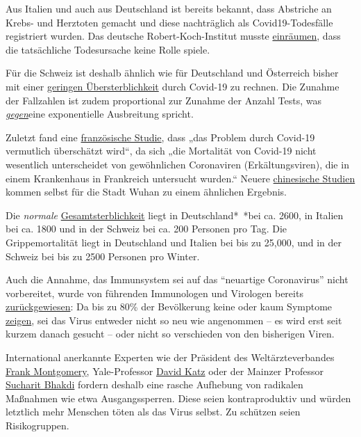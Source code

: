 Aus Italien und auch aus Deutschland ist bereits bekannt, dass Abstriche
an Krebs- und Herztoten gemacht und diese nachträglich als
Covid19-Todesfälle registriert wurden. Das deutsche Robert-Koch-Institut
musste
\href{https://swprs.org/rki-relativiert-corona-todesfaelle/}{einräumen},
dass die tatsächliche Todesursache keine Rolle spiele.

Für die Schweiz ist deshalb ähnlich wie für Deutschland und Österreich
bisher mit einer \href{https://www.euromomo.eu/index.html}{geringen
Übersterblichkeit} durch Covid-19 zu rechnen. Die Zunahme der Fallzahlen
ist zudem proportional zur Zunahme der Anzahl Tests, was
\href{https://multipolar-magazin.de/artikel/coronavirus-irrefuhrung-fallzahlen}{\emph{gegen}}eine
exponentielle Ausbreitung spricht.

Zuletzt fand eine
\href{https://www.sciencedirect.com/science/article/abs/pii/S0924857920300972}{französische
Studie}, dass „das Problem durch Covid-19 vermutlich überschätzt wird``,
da sich „die Mortalität von Covid-19 nicht wesentlich unterscheidet von
gewöhnlichen Coronaviren (Erkältungsviren), die in einem Krankenhaus in
Frankreich untersucht wurden.`` Neuere
\href{https://www.medrxiv.org/content/10.1101/2020.02.12.20022434v2}{chinesische
Studien} kommen selbst für die Stadt Wuhan zu einem ähnlichen Ergebnis.

Die \emph{normale}
\href{https://www.euromomo.eu/index.html}{Gesamtsterblichkeit} liegt in
Deutschland*~*bei ca. 2600, in Italien bei ca. 1800 und in der Schweiz
bei ca. 200 Personen pro Tag. Die Grippemortalität liegt in Deutschland
und Italien bei bis zu 25,000, und in der Schweiz bei bis zu 2500
Personen pro Winter.

Auch die Annahme, das Immunsystem sei auf das ``neuartige Coronavirus''
nicht vorbereitet, wurde von führenden Immunologen und Virologen bereits
\href{https://soundcloud.com/radiomuenchen/wir-kultivieren-mit-dieser-masnahme-den-corona-erreger}{zurückgewiesen}:
Da bis zu 80\% der Bevölkerung keine oder kaum Symptome
\href{https://www.repubblica.it/salute/medicina-e-ricerca/2020/03/16/news/coronavirus_studio_il_50-75_dei_casi_a_vo_sono_asintomatici_e_molto_contagiosi-251474302/}{zeigen},
sei das Virus entweder nicht so neu wie angenommen -- es wird erst seit
kurzem danach gesucht -- oder nicht so verschieden von den bisherigen
Viren.

International anerkannte Experten wie der Präsident des
Weltärzteverbandes
\href{https://www.general-anzeiger-bonn.de/news/politik/deutschland/interview-mit-weltaerztepraesident-montgomery-ueber-corona-pandemie-ist-chaos_aid-49609561}{Frank
Montgomery}, Yale-Professor
\href{https://www.nytimes.com/2020/03/20/opinion/coronavirus-pandemic-social-distancing.html}{David
Katz} oder der Mainzer Professor
\href{https://www.youtube.com/watch?v=JBB9bA-gXL4}{Sucharit Bhakdi}
fordern deshalb eine rasche Aufhebung von radikalen Maßnahmen wie etwa
Ausgangssperren. Diese seien kontraproduktiv und würden letztlich mehr
Menschen töten als das Virus selbst. Zu schützen seien Risikogruppen.

